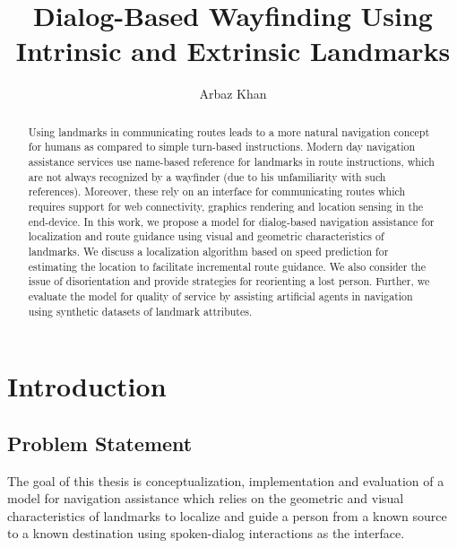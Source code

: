\documentclass{iitkthesis}
\begin{document}
\title{Dialog-Based Wayfinding Using Intrinsic and Extrinsic Landmarks}

\author{Arbaz Khan}
\dissertation
\maketitle
\makecertificate
\begin{abstract}
Using landmarks in communicating routes leads to a more natural 
navigation concept for humans as compared to simple turn-based 
instructions. Modern day navigation assistance services use name-based 
reference for landmarks in route instructions, which are not always 
recognized by a wayfinder (due to his unfamiliarity with such references).
Moreover, these rely on an interface for communicating routes which 
requires support for web connectivity, graphics rendering and location 
sensing in the end-device. In this work, we propose a model for dialog-based 
navigation assistance for localization and route guidance using visual 
and geometric characteristics of landmarks. We discuss a localization 
algorithm based on speed prediction for estimating the location to 
facilitate incremental route guidance. We also consider the issue of 
disorientation and provide strategies for reorienting a lost person. 
Further, we evaluate the model for quality of service by assisting 
artificial agents in navigation using synthetic datasets of landmark 
attributes.
\end{abstract}
\tableofcontents
\chapter{Introduction}
\section{Problem Statement}
The goal of this thesis is conceptualization, implementation and 
evaluation of a model for navigation assistance which relies on the 
geometric and visual characteristics of landmarks to localize and guide a 
person from a known source to a known destination using spoken-dialog 
interactions as the interface.
\end{document}

